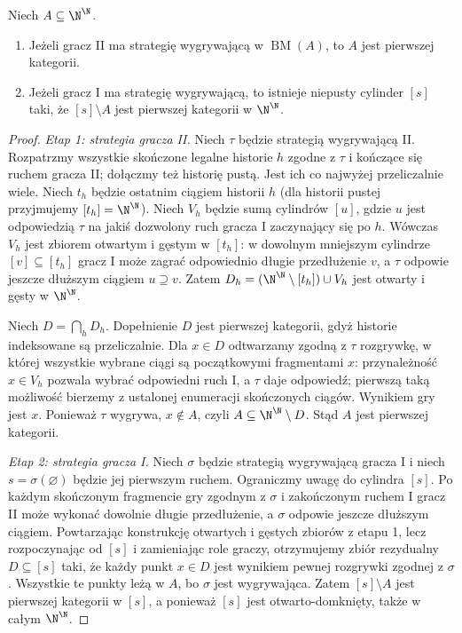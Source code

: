 \begin{lemat}
\label{lem:ad-banach-mazur-category}
Niech $A\subseteq\N^\N$.
\begin{enumerate}
\item Jeżeli gracz II ma strategię wygrywającą w
$\operatorname{BM}(A)$, to $A$ jest pierwszej kategorii.
\item Jeżeli gracz I ma strategię wygrywającą, to istnieje
niepusty cylinder $[s]$ taki, że $[s]\setminus A$
jest pierwszej kategorii w $\N^\N$.
\end{enumerate}
\end{lemat}
\begin{proof}
\emph{Etap 1: strategia gracza II.}
Niech $\tau$ będzie strategią wygrywającą II. Rozpatrzmy
wszystkie skończone legalne historie $h$ zgodne z $\tau$
i kończące się ruchem gracza II; dołączmy też historię pustą.
Jest ich co najwyżej przeliczalnie wiele. Niech $t_h$
będzie ostatnim ciągiem historii $h$ (dla historii pustej
przyjmujemy $[t_h]=\N^\N$).
Niech $V_h$ będzie sumą cylindrów $[u]$, gdzie $u$
jest odpowiedzią $\tau$ na jakiś dozwolony ruch gracza I
zaczynający się po $h$. Wówczas $V_h$ jest zbiorem
otwartym i gęstym w $[t_h]$: w dowolnym mniejszym
cylindrze $[v]\subseteq[t_h]$ gracz I może zagrać
odpowiednio długie przedłużenie $v$, a $\tau$ odpowie
jeszcze dłuższym ciągiem $u\supseteq v$.
Zatem $D_h=(\N^\N\setminus[t_h])\cup V_h$ jest
otwarty i gęsty w $\N^\N$.

Niech $D=\bigcap_hD_h$. Dopełnienie $D$ jest pierwszej
kategorii, gdyż historie indeksowane są przeliczalnie.
Dla $x\in D$ odtwarzamy zgodną z $\tau$ rozgrywkę,
w której wszystkie wybrane ciągi są początkowymi fragmentami
$x$: przynależność $x\in V_h$ pozwala wybrać odpowiedni
ruch I, a $\tau$ daje odpowiedź; pierwszą taką możliwość
bierzemy z ustalonej enumeracji skończonych ciągów.
Wynikiem gry jest $x$. Ponieważ $\tau$ wygrywa,
$x\notin A$, czyli $A\subseteq\N^\N\setminus D$.
Stąd $A$ jest pierwszej kategorii.

\emph{Etap 2: strategia gracza I.}
Niech $\sigma$ będzie strategią wygrywającą gracza I
i niech $s=\sigma(\varnothing)$ będzie jej pierwszym ruchem.
Ograniczmy uwagę do cylindra $[s]$. Po każdym skończonym
fragmencie gry zgodnym z $\sigma$ i zakończonym ruchem I
gracz II może wykonać dowolnie długie przedłużenie,
a $\sigma$ odpowie jeszcze dłuższym ciągiem.
Powtarzając konstrukcję otwartych i gęstych zbiorów
z etapu 1, lecz rozpoczynając od $[s]$ i zamieniając
role graczy, otrzymujemy zbiór rezydualny $D\subseteq[s]$
taki, że każdy punkt $x\in D$ jest wynikiem pewnej
rozgrywki zgodnej z $\sigma$. Wszystkie te punkty leżą
w $A$, bo $\sigma$ jest wygrywająca. Zatem $[s]\setminus A$
jest pierwszej kategorii w $[s]$, a ponieważ $[s]$ jest
otwarto-domknięty, także w całym $\N^\N$.
\end{proof}

